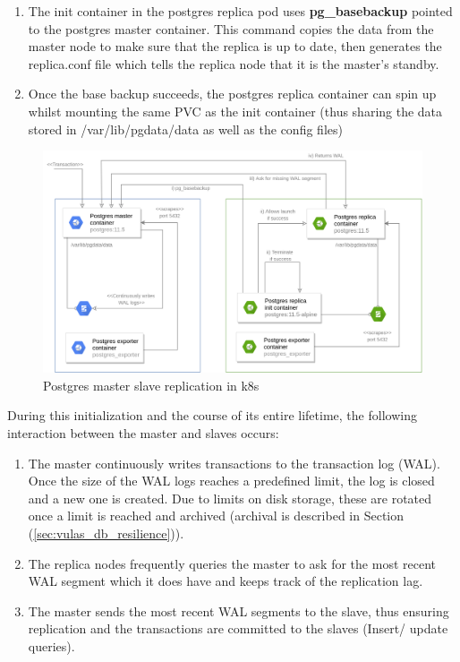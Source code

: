 \documentclass[11pt]{article}
\begin{document}
\begin{enumerate}
    \item The init container in the postgres replica pod uses \textbf{pg\_basebackup} pointed to the postgres master container. This command copies the data from the master node to make sure that the replica is up to date, then generates the replica.conf file which tells the replica node that it is the master's standby.  
    \item Once the base backup succeeds, the postgres replica container can spin up whilst mounting the same PVC as the init container (thus sharing the data stored in /var/lib/pgdata/data as well as the config files)
\end{enumerate}

\begin{figure}[h]
    \centering
    \includegraphics[width=\textwidth]{vulas_postgres.png}
    \caption{Postgres master slave replication in k8s}
    \label{fig:vulas_master_slave}
\end{figure}


\vspace{3mm}
During this initialization and the course of its entire lifetime, the following interaction between the master and slaves occurs:

\begin{enumerate}
    \item The master continuously writes transactions to the transaction log (WAL). Once the size of the WAL logs reaches a predefined limit, the log is closed and a new one is created. Due to limits on disk storage, these are rotated once a limit is reached and archived (archival is described in Section (\ref{sec:vulas_db_resilience})).
    \item The replica nodes frequently queries the master to ask for the most recent WAL segment which it does have and keeps track of the replication lag.
    \item The master sends the most recent WAL segments to the slave, thus ensuring replication and the transactions are committed to the slaves (Insert/ update queries).
\end{enumerate}
\end{document}
